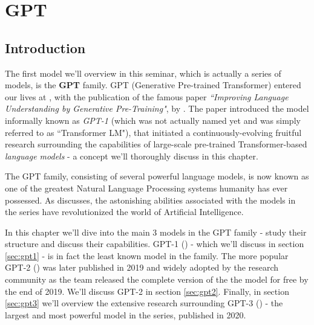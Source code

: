 \documentclass{article}
\begin{document}

\newpage
\section{GPT}
\label{chap:gpt}



\subsection{Introduction}
\label{sec:gpt-intro}

The first model we'll overview in this seminar, which is actually a series of models, is the \textbf{GPT} family. GPT (Generative Pre-trained Transformer) entered our lives at \citeyear{radford2018gpt1}, with the publication of the famous paper \emph{``Improving Language Understanding by Generative Pre-Training"}, by \citet{radford2018gpt1}. The paper introduced the model informally known as \emph{GPT-1} (which was not actually named yet and was simply referred to as ``Transformer LM"), that initiated a continuously-evolving fruitful research surrounding the capabilities of large-scale pre-trained Transformer-based \emph{language models} - a concept we'll thoroughly discuss in this chapter.

\medskip
\noindent
The GPT family, consisting of several powerful language models, is now known as one of the greatest Natural Language Processing systems humanity has ever possessed. As \citet{inamdar2021revolution} discusses, the astonishing abilities associated with the models in the series have revolutionized the world of Artificial Intelligence.

\medskip
\noindent
In this chapter we'll dive into the main 3 models in the GPT family - study their structure and discuss their capabilities. GPT-1 (\citet{radford2018gpt1}) - which we'll discuss in section \ref{sec:gpt1} - is in fact the least known model in the family. The more popular GPT-2 (\citet{radford2019gpt2}) was later published in 2019 and widely adopted by the research community as the team released the complete version of the the model for free by the end of 2019. We'll discuss GPT-2 in section \ref{sec:gpt2}. Finally, in section \ref{sec:gpt3} we'll overview the extensive research surrounding GPT-3 (\citet{brown2020gpt3}) - the largest and most powerful model in the series, published in 2020.
\end{document}

